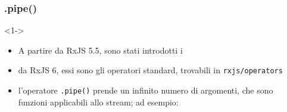             \subsubsection{.pipe()}\label{subsub:pipe}

            \begin{frame}{\insertsubsectionhead}{}
                \begin{block}{\texttt{\insertsubsubsectionhead}}<1->
                    \begin{itemize}
                        \item
                            A partire da RxJS 5.5, sono stati introdotti i 
                        \item
                            da RxJS 6, essi sono gli operatori standard, trovabili in \texttt{rxjs/operators}
                        \item
                            l'operatore \texttt{.pipe()} prende un infinito numero di argomenti, che sono funzioni applicabili allo stream; ad esempio:

                            \inputminted{js}{src/pipe.js}

                    \end{itemize}
                \end{block}
                 {
                }
            \end{frame}

